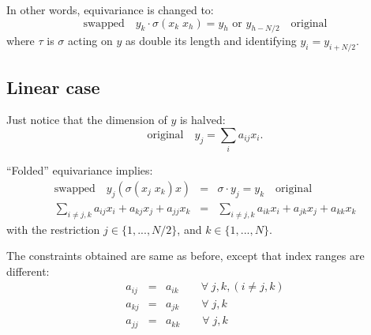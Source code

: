 In other words, equivariance is changed to:
\begin{equation}
\boxed{\mbox{swapped}} \quad y_k \cdot \sigma(x_k \; x_h) = y_h \mbox{  or  } y_{h-N/2} \quad \boxed{\mbox{original}} \end{equation}
where $\tau$ is $\sigma$ acting on $y$ as double its length and identifying $y_i = y_{i + N/2}$.

\subsection{Linear case}

Just notice that the dimension of $y$ is halved:
\begin{equation}
\boxed{\mbox{original}} \quad y_j = \sum_i a_{ij} x_i .
\end{equation}

``Folded'' equivariance implies:
\begin{eqnarray}
\boxed{\mbox{swapped}} \quad y_j ( \sigma(x_j \; x_k) x) %
&=& \sigma \cdot y_j = y_k \quad \boxed{\mbox{original}} \\
\sum_{i \neq j,k} a_{ij} x_i + a_{kj} x_j + a_{jj} x_k &=& \sum_{i \neq j,k} a_{ik} x_i + a_{jk} x_j + a_{kk} x_k  \nonumber
\end{eqnarray}
with the restriction $j \in \{ 1,..., N/2 \}$, and $k \in \{ 1,..., N \}$.

The constraints obtained are same as before, except that index ranges are different:
\begin{eqnarray}
a_{ij} &=& a_{ik} \quad \quad \forall \;  j, k, (i \neq j, k) \nonumber \\
a_{kj} &=& a_{jk} \quad \quad \forall \;  j, k \nonumber \\
a_{jj} &=& a_{kk} \quad \quad \forall \;  j, k \nonumber
\end{eqnarray}

